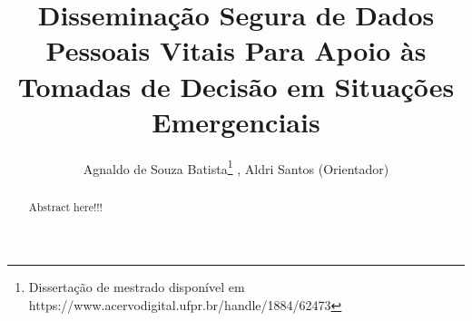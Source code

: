 \documentclass[12pt]{article}
\title{Disseminação Segura de Dados Pessoais Vitais Para Apoio às Tomadas de Decisão em Situações Emergenciais}
\author{Agnaldo de Souza Batista\inst{1}\thanks{{Dissertação de mestrado disponível em https://www.acervodigital.ufpr.br/handle/1884/62473}}\,\,, Aldri Santos\inst{1} (Orientador)}
\begin{document}
 
\pagestyle{myheadings} %
\maketitle

\begin{abstract}
Abstract here!!!

\end{abstract}
\end{document}
